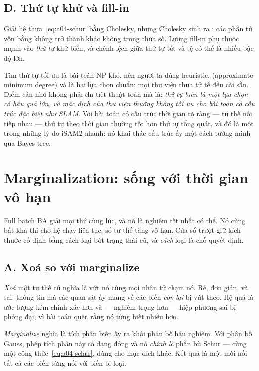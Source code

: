 \documentclass[../../vslam.tex]{subfiles}
\begin{document}
\subsection{D. Thứ tự khử và fill-in}

Giải hệ thưa~\eqref{eq:a04-schur} bằng Cholesky, nhưng Cholesky sinh ra : các phần tử vốn bằng không trở thành khác không trong thừa số. Lượng fill-in phụ thuộc mạnh vào \emph{thứ tự} khử biến, và chênh lệch giữa thứ tự tốt và tệ có thể là nhiều bậc độ lớn.

Tìm thứ tự tối ưu là bài toán NP-khó, nên người ta dùng heuristic.  (approximate minimum degree) và  là hai lựa chọn chuẩn; mọi thư viện thưa tử tế đều cài sẵn. Điểm cần nhớ không phải chi tiết thuật toán mà là: \emph{thứ tự biến là một lựa chọn có hậu quả lớn, và mặc định của thư viện thường không tối ưu cho bài toán có cấu trúc đặc biệt như SLAM}. Với bài toán có cấu trúc thời gian rõ ràng --- tư thế nối tiếp nhau --- thứ tự theo thời gian thường tốt hơn thứ tự tổng quát, và đó là một trong những lý do iSAM2 \cite{kaess2012isam2} nhanh: nó khai thác cấu trúc ấy một cách tường minh qua Bayes tree.

\section{Marginalization: sống với thời gian vô hạn}

Full batch BA giải mọi thứ cùng lúc, và nó là nghiệm tốt nhất có thể. Nó cũng bất khả thi cho hệ chạy liên tục: số tư thế tăng vô hạn. Cửa sổ trượt giữ kích thước cố định bằng cách loại bớt trạng thái cũ, và \emph{cách} loại là chỗ quyết định.

\subsection{A. Xoá so với marginalize}

\emph{Xoá} một tư thế cũ nghĩa là vứt nó cùng mọi nhân tử chạm nó. Rẻ, đơn giản, và sai: thông tin mà các quan sát ấy mang về các biến \emph{còn lại} bị vứt theo. Hệ quả là ước lượng kém chính xác hơn và --- nghiêm trọng hơn --- hiệp phương sai bị phóng đại, vì bài toán quên rằng nó từng biết nhiều hơn.

\emph{Marginalize} nghĩa là tích phân biến ấy ra khỏi phân bố hậu nghiệm. Với phân bố Gauss, phép tích phân này có dạng đóng và nó \emph{chính là} phần bù Schur --- cùng một công thức~\eqref{eq:a04-schur}, dùng cho mục đích khác. Kết quả là một  mới nối tất cả các biến từng nối với biến bị loại.
\end{document}
